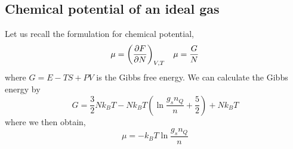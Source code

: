 \documentclass{book}
\begin{document}
\subsection{Chemical potential of an ideal gas}
Let us recall the formulation for chemical potential,
\begin{align}
	\mu = \left(\pdv{F}{N}\right)_{V,T} && \mu = \frac{G}{N}
\end{align}
where $G = E - TS + PV$ is the Gibbs free energy. We can calculate the Gibbs energy by
\begin{equation}
	G = \frac{3}{2}Nk_BT - Nk_BT\left(\ln\frac{g_sn_Q}{n} + \frac{5}{2}\right) + Nk_BT 
\end{equation}
where we then obtain,
\begin{equation}
	\boxed{\mu = - k_BT\ln\frac{g_sn_Q}{n}}
\end{equation}
\end{document}

